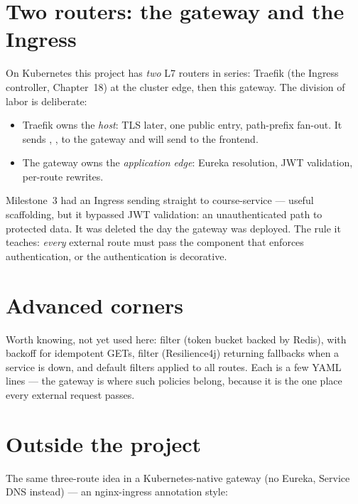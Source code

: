 \section{Two routers: the gateway and the Ingress}

On Kubernetes this project has \emph{two} L7 routers in series: Traefik
(the Ingress controller, Chapter~18) at the cluster edge, then this
gateway. The division of labor is deliberate:

\begin{itemize}
  \item Traefik owns the \emph{host}: TLS later, one public entry,
  path-prefix fan-out. It sends , ,
   to the gateway and will send \code{/} to the
  frontend.
  \item The gateway owns the \emph{application edge}: Eureka resolution,
  JWT validation, per-route rewrites.
\end{itemize}

\begin{decision}
Milestone~3 had an Ingress sending  straight to
course-service --- useful scaffolding, but it bypassed JWT validation:
an unauthenticated path to protected data. It was deleted the day the
gateway was deployed. The rule it teaches: \emph{every} external route
must pass the component that enforces authentication, or the
authentication is decorative.
\end{decision}

\section{Advanced corners}

Worth knowing, not yet used here:  filter
(token bucket backed by Redis),  with backoff for idempotent
GETs,  filter (Resilience4j) returning fallbacks
when a service is down, and default filters applied to all routes. Each
is a few YAML lines --- the gateway is where such policies belong,
because it is the one place every external request passes.

\section{Outside the project}

The same three-route idea in a Kubernetes-native gateway (no Eureka,
Service DNS instead) --- an nginx-ingress annotation style:

